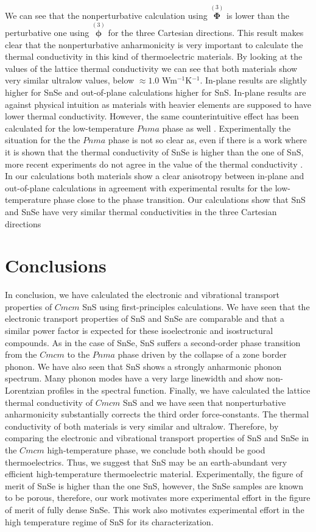 We can see that the nonperturbative calculation using $\overset{(3)}{\boldsymbol{\Phi}}$ is lower than the perturbative one using $\overset{(3)}{\boldsymbol{\phi}}$ for the three Cartesian directions. This result makes clear that
the nonperturbative anharmonicity is very important to calculate the thermal conductivity in this kind of thermoelectric materials. By looking at the values of the lattice thermal conductivity we can see that both materials show
very similar ultralow values, below $\approx 1.0$ Wm$^{-1}$K$^{-1}$. In-plane results are slightly higher for SnSe and out-of-plane calculations higher for SnS.
In-plane results are against physical intuition as materials with heavier elements are supposed to have lower thermal conductivity. However, the same counterintuitive effect has been calculated for the low-temperature $Pnma$ phase 
as well \cite{skelton2017lattice,guo2015first}.
Experimentally the situation for the the $Pnma$ phase is not so clear as, even if there is a work \cite{wasscher1963simple} where it is shown that the thermal conductivity of SnSe is higher than the one of SnS, more recent experiments do not agree in the value of the thermal conductivity  \cite{he2018remarkable,tan2014thermoelectrics}.
In our calculations both materials show a clear anisotropy between in-plane and out-of-plane calculations in agreement
with experimental results\cite{ibrahim2017reinvestigation} for the low-temperature phase close to the phase transition. Our calculations show that SnS and SnSe have very similar thermal conductivities in the three Cartesian
directions

\section{Conclusions}

In conclusion, we have calculated the electronic and vibrational transport properties of $Cmcm$ SnS using first-principles calculations. We have seen that the electronic transport properties of SnS and SnSe are comparable and that a
similar power factor is expected for these isoelectronic and isostructural compounds. As in the case of SnSe, SnS suffers a second-order phase transition from the $Cmcm$ to the $Pnma$ phase driven by the collapse of a zone border
phonon. We have also seen that SnS shows a strongly anharmonic phonon spectrum. Many phonon modes have a very large linewidth and show non-Lorentzian profiles in the spectral function. Finally, we have calculated the lattice thermal
conductivity of $Cmcm$ SnS and we have seen that nonperturbative anharmonicity substantially corrects the third order force-constants. The thermal conductivity of both materials is very similar and
ultralow. Therefore, by comparing the electronic and vibrational transport properties of SnS and SnSe in the $Cmcm$ high-temperature phase, we conclude both should be good thermoelectrics. Thus, we suggest that SnS may be an
earth-abundant very efficient high-temperature thermoelectric material. Experimentally, the figure of merit of SnSe is higher than the one SnS, however, the SnSe samples are known to be porous, therefore, our work motivates more
experimental effort in the figure of merit of fully dense SnSe. This work also motivates experimental effort in the high temperature regime of SnS for its characterization.

